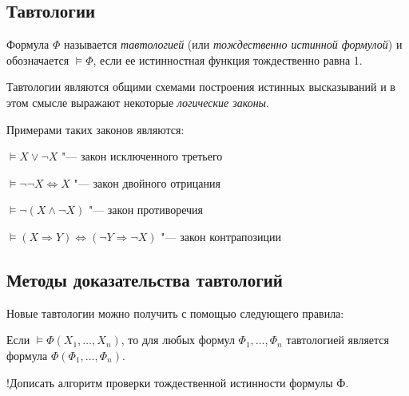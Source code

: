 \subsection*{Тавтологии}
\begin{definition}
    Формула $\Phi$ называется \textit{тавтологией} (или \textit{тождественно истинной формулой}) и обозначается $\vDash\Phi$, если ее истинностная функция тождественно равна 1.
\end{definition}

Тавтологии являются общими схемами построения истинных высказываний и в этом смысле выражают некоторые \textit{логические законы}.

Примерами таких законов являются:

$\vDash X \lor \lnot X$ "--- закон исключенного третьего

$\vDash\lnot\lnot X \Leftrightarrow X$ "--- закон двойного отрицания

$\vDash\lnot(X \land \lnot X)$ "--- закон противоречия

$\vDash(X\Rightarrow Y) \Leftrightarrow (\lnot Y \Rightarrow \lnot X)$ "--- закон контрапозиции

\subsection*{Методы доказательства тавтологий}
Новые тавтологии можно получить с помощью следующего правила:
\begin{theorem}
    Если $\vDash \Phi (X_1,\dots,X_n)$, то для любых формул $\Phi_1,\dots,\Phi_n$ тавтологией является формула $\Phi(\Phi_1,\dots,\Phi_n)$.
\end{theorem}

!Дописать алгоритм проверки тождественной истинности формулы Ф.